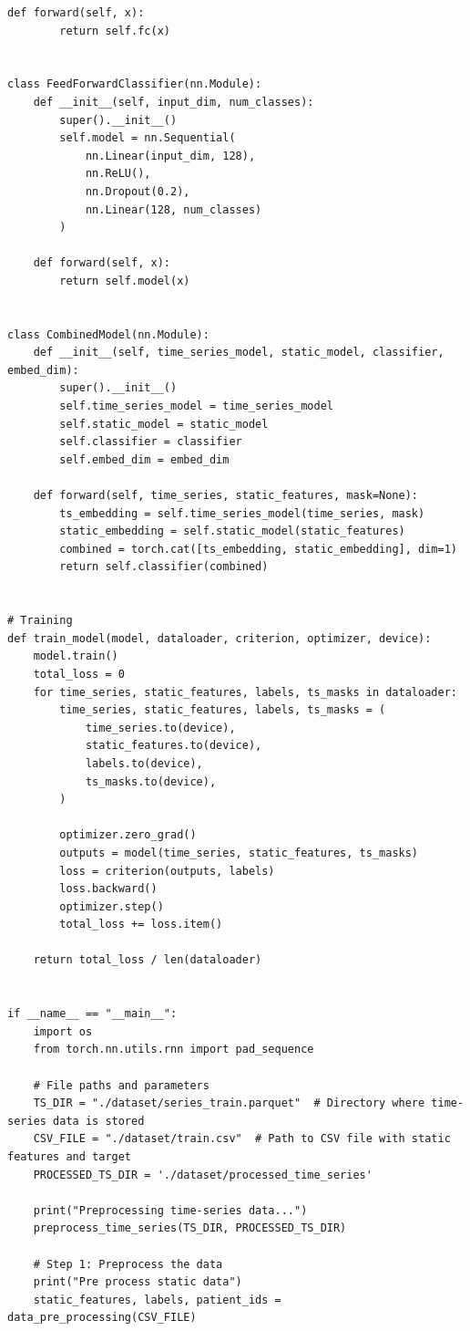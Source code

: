 \begin{appendices}
\begin{mdframed}
\begin{lstlisting}[breaklines=true]
    def forward(self, x):
        return self.fc(x)


class FeedForwardClassifier(nn.Module):
    def __init__(self, input_dim, num_classes):
        super().__init__()
        self.model = nn.Sequential(
            nn.Linear(input_dim, 128),
            nn.ReLU(),
            nn.Dropout(0.2),
            nn.Linear(128, num_classes)
        )

    def forward(self, x):
        return self.model(x)


class CombinedModel(nn.Module):
    def __init__(self, time_series_model, static_model, classifier, embed_dim):
        super().__init__()
        self.time_series_model = time_series_model
        self.static_model = static_model
        self.classifier = classifier
        self.embed_dim = embed_dim

    def forward(self, time_series, static_features, mask=None):
        ts_embedding = self.time_series_model(time_series, mask)
        static_embedding = self.static_model(static_features)
        combined = torch.cat([ts_embedding, static_embedding], dim=1)
        return self.classifier(combined)


# Training
def train_model(model, dataloader, criterion, optimizer, device):
    model.train()
    total_loss = 0
    for time_series, static_features, labels, ts_masks in dataloader:
        time_series, static_features, labels, ts_masks = (
            time_series.to(device),
            static_features.to(device),
            labels.to(device),
            ts_masks.to(device),
        )

        optimizer.zero_grad()
        outputs = model(time_series, static_features, ts_masks)
        loss = criterion(outputs, labels)
        loss.backward()
        optimizer.step()
        total_loss += loss.item()

    return total_loss / len(dataloader)


if __name__ == "__main__":
    import os
    from torch.nn.utils.rnn import pad_sequence

    # File paths and parameters
    TS_DIR = "./dataset/series_train.parquet"  # Directory where time-series data is stored
    CSV_FILE = "./dataset/train.csv"  # Path to CSV file with static features and target
    PROCESSED_TS_DIR = './dataset/processed_time_series'
    
    print("Preprocessing time-series data...")
    preprocess_time_series(TS_DIR, PROCESSED_TS_DIR)
    
    # Step 1: Preprocess the data
    print("Pre process static data")
    static_features, labels, patient_ids = data_pre_processing(CSV_FILE)
    

\end{lstlisting}
\end{mdframed}
\end{appendices}
